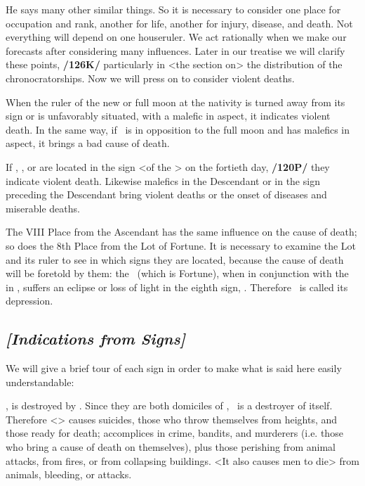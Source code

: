 He says many other similar things. So it is necessary to consider one place for occupation and rank, another for life, another for injury, disease, and death. Not everything will depend on one houseruler. We act rationally when we make our forecasts after considering many influences. Later in our treatise we will clarify these points, \textbf{/126K/} particularly in <the section on> the distribution of the chronocratorships. Now we will press on to consider violent deaths. 

When the ruler of the new or full moon at the nativity is turned away from its sign or is unfavorably situated, with a malefic in aspect, it indicates violent death. In the same way, if \Mercury\, is in opposition to the full moon and has malefics in aspect, it brings a bad cause of death. 

If \Saturn, \Mars, or \Mercury are located in the sign <of the \Moon> on the fortieth day, \textbf{/120P/} they indicate violent death. Likewise malefics in the Descendant or
in the sign preceding the Descendant bring violent deaths or the onset of diseases and miserable deaths.

The VIII Place from the Ascendant has the same influence on the cause of death; so does the 8th Place from the Lot of Fortune. It is necessary to examine the Lot and its ruler to see in which signs they are located, because the cause of death will be foretold by them: the \Moon\, (which is Fortune), when in conjunction with the \Sun\, in \Aries, suffers an eclipse or loss of light in the eighth sign, \Scorpio. Therefore \Scorpio\, is called its depression.

\subsection{\textit{[Indications from Signs]}}
We will give a brief tour of each sign in order to make what is said here easily understandable:

\Aries, \mn{\Aries} is destroyed by \Scorpio. Since they are both domiciles of \Mars, \Mars\, is a destroyer of itself. Therefore <\Aries> causes suicides, those who throw themselves from heights, and those ready for death; accomplices in crime, bandits, and murderers (i.e. those who bring a cause of death on themselves), plus those perishing from animal attacks, from fires, or from collapsing buildings. <It also causes men to die> from animals, bleeding, or attacks.

